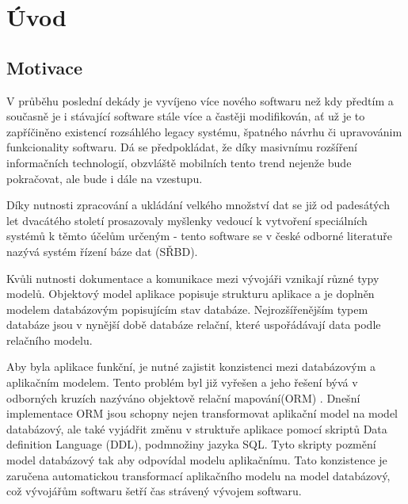 \documentclass[11pt,twoside,a4paper]{book}
\begin{document}
\listoftables

\listofalgorithms


\mainbodystarts


% 
% 

\chapter{Úvod}
\section{Motivace}

V průběhu poslední dekády je vyvíjeno více nového softwaru než kdy předtím a
současně je i stávající software stále více a častěji modifikován, ať už
je to zapříčiněno  existencí rozsáhlého legacy systému, špatného návrhu či
upravovánim funkcionality softwaru. Dá se předpokládat, že díky masivnímu
rozšíření informačních technologií, obzvláště mobilních tento trend nejenže bude
pokračovat, ale bude i dále na vzestupu.

Díky nutnosti zpracování a ukládání velkého množství dat se již od padesátých
let dvacátého století prosazovaly myšlenky vedoucí k vytvoření speciálních
systémů k těmto účelům určeným - tento software se v české odborné literatuře
nazývá systém řízení báze dat (SŘBD). 

Kvůli nutnosti dokumentace a komunikace mezi vývojáři vznikají různé typy
modelů. Objektový model aplikace popisuje strukturu aplikace a je doplněn 
modelem databázovým popisujícím stav databáze. Nejrozšířenějším typem
databáze jsou v nynější době databáze relační, které uspořádávají data podle
relačního modelu. 

Aby byla aplikace funkční, je nutné zajistit konzistenci mezi databázovým a
aplikačním modelem.
Tento problém byl již vyřešen a jeho řešení bývá v odborných kruzích nazýváno
objektově relační mapování(ORM) \cite{orm}. Dnešní implementace ORM jsou schopny nejen
transformovat aplikační model na model databázový, ale také vyjádřit změnu v struktuře
aplikace pomocí skriptů Data definition Language (DDL), podmnožiny jazyka SQL.
Tyto skripty pozmění model databázový tak aby odpovídal modelu aplikačnímu.
Tato konzistence je zaručena automatickou transformací aplikačního modelu na
model databázový, což vývojářům softwaru šetří čas strávený vývojem softwaru.
\end{document}
